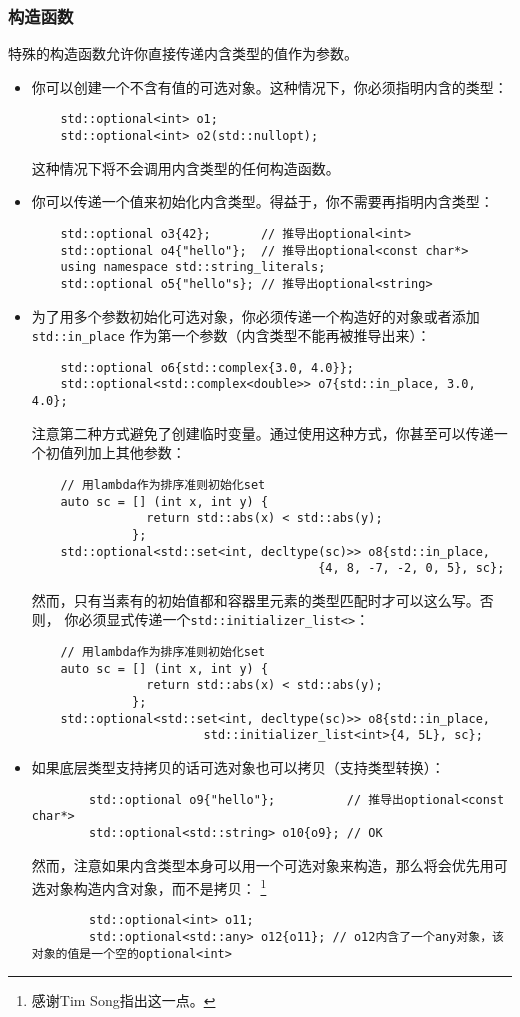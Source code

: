 \subsubsection*{构造函数}
特殊的构造函数允许你直接传递内含类型的值作为参数。
\begin{itemize}[leftmargin=*]
    \item 你可以创建一个不含有值的可选对象。这种情况下，你必须指明内含的类型：
    \begin{lstlisting}
    std::optional<int> o1;
    std::optional<int> o2(std::nullopt);
    \end{lstlisting}
    这种情况下将不会调用内含类型的任何构造函数。
    \item 你可以传递一个值来初始化内含类型。得益于，你不需要再指明内含类型：
    \begin{lstlisting}
    std::optional o3{42};       // 推导出optional<int>
    std::optional o4{"hello"};  // 推导出optional<const char*>
    using namespace std::string_literals;
    std::optional o5{"hello"s}; // 推导出optional<string>
    \end{lstlisting}
    \item 为了用多个参数初始化可选对象，你必须传递一个构造好的对象或者添加\texttt{std::in\_place}
    作为第一个参数（内含类型不能再被推导出来）：
    \begin{lstlisting}
    std::optional o6{std::complex{3.0, 4.0}};
    std::optional<std::complex<double>> o7{std::in_place, 3.0, 4.0};
    \end{lstlisting}
    注意第二种方式避免了创建临时变量。通过使用这种方式，你甚至可以传递一个初值列加上其他参数：
    \begin{lstlisting}
    // 用lambda作为排序准则初始化set
    auto sc = [] (int x, int y) {
                return std::abs(x) < std::abs(y);
              };
    std::optional<std::set<int, decltype(sc)>> o8{std::in_place,
                                        {4, 8, -7, -2, 0, 5}, sc};
    \end{lstlisting}
    然而，只有当素有的初始值都和容器里元素的类型匹配时才可以这么写。否则，
    你必须显式传递一个\texttt{std::initializer\_list<>}：
    \begin{lstlisting}
    // 用lambda作为排序准则初始化set
    auto sc = [] (int x, int y) {
                return std::abs(x) < std::abs(y);
              };
    std::optional<std::set<int, decltype(sc)>> o8{std::in_place,
                        std::initializer_list<int>{4, 5L}, sc};
    \end{lstlisting}
    \item 如果底层类型支持拷贝的话可选对象也可以拷贝（支持类型转换）：
    \begin{lstlisting}
        std::optional o9{"hello"};          // 推导出optional<const char*>
        std::optional<std::string> o10{o9}; // OK
    \end{lstlisting}
    然而，注意如果内含类型本身可以用一个可选对象来构造，那么将会优先用可选对象构造内含对象，而不是拷贝：
    \footnote{感谢Tim Song指出这一点。}
    \begin{lstlisting}
        std::optional<int> o11;
        std::optional<std::any> o12{o11}; // o12内含了一个any对象，该对象的值是一个空的optional<int>
    \end{lstlisting}
\end{itemize}
